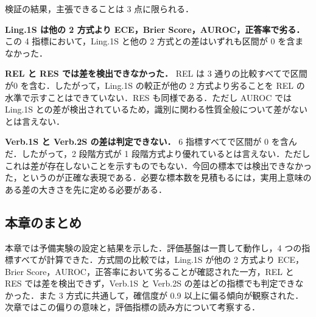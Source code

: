 検証の結果，主張できることは 3 点に限られる．

\textbf{Ling.1S は他の 2 方式より ECE，Brier Score，AUROC，正答率で劣る．}この 4 指標において，Ling.1S と他の 2 方式との差はいずれも区間が 0 を含まなかった．

\textbf{REL と RES では差を検出できなかった．} REL は 3 通りの比較すべてで区間が0 を含む．したがって，Ling.1S の較正が他の 2 方式より劣ることを REL の水準で示すことはできていない．RES も同様である．ただし AUROC では Ling.1S との差が検出されているため，識別に関わる性質全般について差がないとは言えない．

\textbf{Verb.1S と Verb.2S の差は判定できない．} 6 指標すべてで区間が 0 を含んだ．したがって，2 段階方式が 1 段階方式より優れているとは言えない．ただしこれは差が存在しないことを示すものでもない．今回の標本では検出できなかった，というのが正確な表現である．必要な標本数を見積もるには，実用上意味のある差の大きさを先に定める必要がある．

\subsection{本章のまとめ}

本章では予備実験の設定と結果を示した．評価基盤は一貫して動作し，4 つの指標すべてが計算できた．方式間の比較では，Ling.1S が他の 2 方式より ECE，Brier Score，AUROC，正答率において劣ることが確認された一方，REL と RES では差を検出できず，Verb.1S と Verb.2S の差はどの指標でも判定できなかった．また 3 方式に共通して，確信度が 0.9 以上に偏る傾向が観察された．次章ではこの偏りの意味と，評価指標の読み方について考察する．
